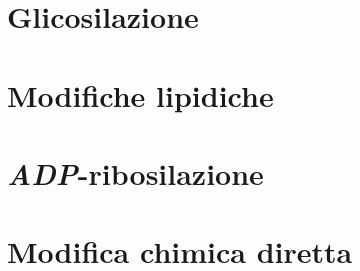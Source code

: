 \section{Glicosilazione}

\section{Modifiche lipidiche}

\section{\emph{ADP}-ribosilazione}

\section{Modifica chimica diretta}

